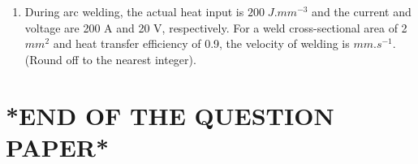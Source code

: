 \documentclass[journal]{IEEEtran}
\theoremstyle{remark}
\begin{document}
\begin{enumerate}[resume]
\item During arc welding, the actual heat input is $200\; J.mm^{-3}$ and the current and voltage are 200 A and 20 V, respectively. For a weld cross-sectional area of 2 $mm^2$ and heat transfer efficiency of 0.9, the velocity of welding is \underline{\hspace{2cm}} $mm.s^{-1}$. (Round off to the nearest integer). \hfill{}

\end{enumerate}

\section*{*END OF THE QUESTION PAPER*}
 
\end{document}
